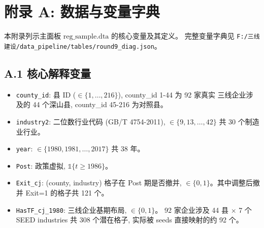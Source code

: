 \documentclass[11pt,a4paper]{article}
\begin{document}







\appendix
\section*{附录 A: 数据与变量字典}

\noindent 本附录列示主面板 $\mathrm{reg\_sample.dta}$ 的核心变量及其定义。
完整变量字典见 \texttt{F:/三线建设/data\_pipeline/tables/round9\_diag.json}。

\subsection*{A.1 核心解释变量}

\begin{itemize}
\item \texttt{county\_id}: 县 ID ($\in\{1,\ldots,216\}$), county\_id 1-44 为 92 家真实
      三线企业涉及的 44 个深山县, county\_id 45-216 为对照县。
\item \texttt{industry2}: 二位数行业代码 (GB/T 4754-2011), $\in\{9,13,\ldots,42\}$
      共 30 个制造业行业。
\item \texttt{year}: $\in\{1980,1981,\ldots,2017\}$ 共 38 年。
\item \texttt{Post}: 政策虚拟, $\mathbb{1}\{t\geq 1986\}$。
\item \texttt{Exit\_cj}: (county, industry) 格子在 Post 期是否撤并,
      $\in\{0,1\}$。其中调整后撤并 Exit=1 的格子共 121 个。
\item \texttt{HasTF\_cj\_1980}: 三线企业基期布局, $\in\{0,1\}$。
      92 家企业涉及 44 县 $\times$ 7 个 SEED industries 共 308 个潜在格子,
      实际被 seeds 直接映射的约 92 个。
\end{itemize}
\end{document}
